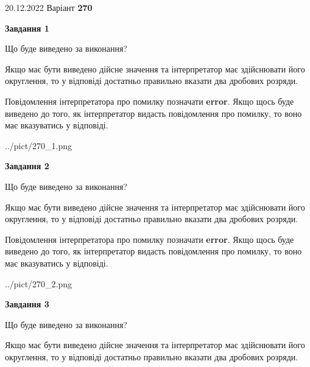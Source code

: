\documentclass[12pt, ukrainian]{article}
\begin{document}
{20.12.2022 Варіант \No \textbf { 270 }\par}
{
\begin {Large}

{\begin {center}\textbf{Завдання 1}\end {center}}\par
Що буде виведено за виконання? \par

Якщо має бути виведено дійсне значення та інтерпретатор має здійснювати його округлення, 
то у відповіді достатньо правильно вказати два дробових розряди.

Повідомлення інтерпретатора про помилку позначати \textbf{error}.
Якщо щось буде виведено до того, як інтерпретатор видасть повідомлення про помилку, 
то воно має вказуватись у відповіді. \par

\begin{center}
	{../pict/270_1.png}
\end{center}
\newpage

{\begin {center}\textbf{Завдання 2}\end {center}}\par
Що буде виведено за виконання? \par

Якщо має бути виведено дійсне значення та інтерпретатор має здійснювати його округлення, 
то у відповіді достатньо правильно вказати два дробових розряди.

Повідомлення інтерпретатора про помилку позначати \textbf{error}.
Якщо щось буде виведено до того, як інтерпретатор видасть повідомлення про помилку, 
то воно має вказуватись у відповіді. \par

\begin{center}
	{../pict/270_2.png}
\end{center}
\newpage

{\begin {center}\textbf{Завдання 3}\end {center}}\par
Що буде виведено за виконання? \par

Якщо має бути виведено дійсне значення та інтерпретатор має здійснювати його округлення, 
то у відповіді достатньо правильно вказати два дробових розряди.


\end{Large}}
\end{document}
